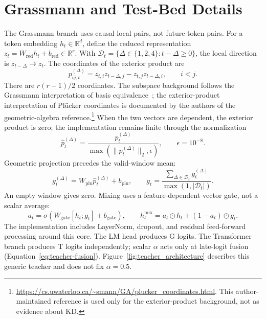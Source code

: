 \section{Grassmann and Test-Bed Details}\label{app:architecture}

The Grassmann branch uses causal local pairs, not future-token pairs. For a token embedding $h_t\in\mathbb{R}^d$, define the reduced representation $z_t=W_{\mathrm{red}}h_t+b_{\mathrm{red}}\in\mathbb{R}^r$. With $\mathcal{D}_t=\{\Delta\in\{1,2,4\}:t-\Delta\geq0\}$, the local direction is $z_{t-\Delta}\rightarrow z_t$. The coordinates of the exterior product are
\begin{equation}
p_{ij,t}^{(\Delta)}
=z_{t,i}z_{t-\Delta,j}-z_{t,j}z_{t-\Delta,i},
\qquad i<j.
\end{equation}
There are $r(r-1)/2$ coordinates. The subspace background follows the Grassmann interpretation of basis equivalence~\citep{edelman1998geometry}; the exterior-product interpretation of Pl\"ucker coordinates is documented by the authors of the geometric-algebra reference.\footnote{\url{https://cs.uwaterloo.ca/~smann/GA/plucker_coordinates.html}. This author-maintained reference is used only for the exterior-product background, not as evidence about KD.}
When the two vectors are dependent, the exterior product is zero; the implementation remains finite through the normalization
\begin{equation}
\widehat p_t^{(\Delta)}
=\frac{p_t^{(\Delta)}}{\max(\|p_t^{(\Delta)}\|_2,\epsilon)},
\qquad \epsilon=10^{-8}.
\end{equation}
Geometric projection precedes the valid-window mean:
\begin{equation}
g_t^{(\Delta)}=W_{\mathrm{plu}}\widehat p_t^{(\Delta)}+b_{\mathrm{plu}},
\qquad
g_t=\frac{\sum_{\Delta\in\mathcal{D}_t}g_t^{(\Delta)}}
{\max(1,|\mathcal{D}_t|)}.
\end{equation}
An empty window gives zero. Mixing uses a feature-dependent vector gate, not a scalar average:
\begin{equation}
a_t=\sigma(W_{\mathrm{gate}}[h_t;g_t]+b_{\mathrm{gate}}),
\qquad
h_t^{\mathrm{mix}}=a_t\odot h_t+(1-a_t)\odot g_t.
\end{equation}
The implementation includes LayerNorm, dropout, and residual feed-forward processing around this core. The LM head produces G logits. The Transformer branch produces T logits independently; scalar $\alpha$ acts only at late-logit fusion (Equation~\ref{eq:teacher-fusion}). Figure~\ref{fig:teacher_architecture} describes this generic teacher and does not fix $\alpha=0.5$.

